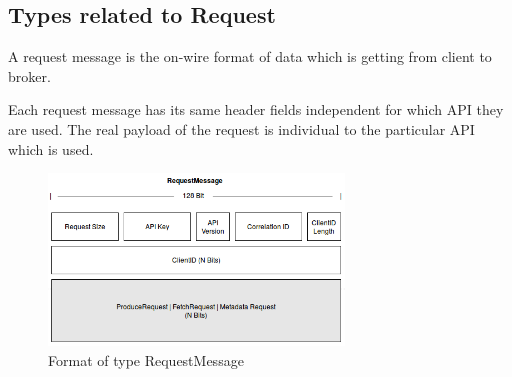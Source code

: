 \subsection{Types related to Request}
A request message is the on-wire format of data which is getting from client to
broker.

Each request message has its same header fields independent for which API they are used. 
The real payload of the request is individual to the particular API which is
used. 

\begin{figure}[H]
    \centering
    \includegraphics[width=0.7\textwidth]{images/impl-prot-types-requestMessage.png}
    \caption{Format of type RequestMessage}
    \label{fig:impl-prot-types-requestMessage}
\end{figure}

